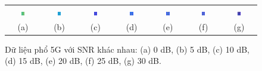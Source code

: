 \begin{figure}[!h]
    \centering
    \footnotesize
    \begin{tabular}{ccccccc}
        \includegraphics[width=0.12\textwidth]{fig/NR_frame_0db.png} & \includegraphics[width=0.12\textwidth]{fig/NR_frame_5db.png} &
        \includegraphics[width=0.12\textwidth]{fig/NR_frame_10db.png} &
        \includegraphics[width=0.12\textwidth]{fig/NR_frame_15db.png} & \includegraphics[width=0.12\textwidth]{fig/NR_frame_20db.png} &
        \includegraphics[width=0.12\textwidth]{fig/NR_frame_25db.png} &
        \includegraphics[width=0.12\textwidth]{fig/NR_frame_30db.png}
        \\
        (a) & (b) & (c) & (d) & (e) & (f) & (g)
    \end{tabular}
    \caption{Dữ liệu phổ 5G với SNR khác nhau: (a) 0 dB, (b) 5 dB, (c) 10 dB, (d) 15 dB, (e) 20 dB, (f) 25 dB, (g) 30 dB.}
    \label{fig_dataset5G}
\end{figure}

